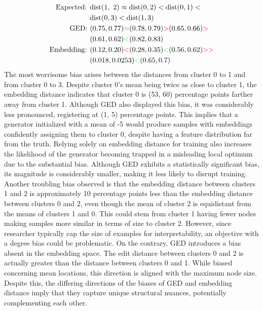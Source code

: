 \documentclass[
  11pt,
  letterpaper,
]{article}
\begin{document}
\begin{align*}
    \text{Expected: } &\text{dist}(1,\ 2) \approx \text{dist}(0, 2) < \text{dist}(0, 1) < \\ 
    &\text{dist}(0, 3) < \text{dist}(1, 3) \\ 
    \text{GED: }&(0.75, 0.77) \textcolor{green}{\approx} (0.78, 0.79) 
                \textcolor{red}{>} (0.65, 0.66) \textcolor{red}{>} \\
                &(0.61, 0.62) \textcolor{green}{<} (0.82, 0.83) \\
    \text{Embedding: }&(0.12, 0.20) \textcolor{red}{<} (0.28, 0.35) 
                \textcolor{green}{<} (0.56, 0.62) \textcolor{red}{>>} \\
                &(0.018, 0.0253) \textcolor{green}{<} (0.65, 0.7)
\end{align*} The most worrisome bias arises between the distances from
cluster 0 to 1 and from cluster 0 to 3. Despite cluster 0's mean being
twice as close to cluster 1, the embedding distance indicates that
cluster 0 is (53, 60) percentage points farther away from cluster 1.
Although GED also displayed this bias, it was considerably less
pronounced, registering at (1, 5) percentage points. This implies that a
generator initialized with a mean of -5 would produce samples with
embeddings confidently assigning them to cluster 0, despite having a
feature distribution far from the truth. Relying solely on embedding
distance for training also increases the likelihood of the generator
becoming trapped in a misleading local optimum due to the substantial
bias. Although GED exhibits a statistically significant bias, its
magnitude is considerably smaller, making it less likely to disrupt
training. Another troubling bias observed is that the embedding distance
between clusters 1 and 2 is approximately 10 percentage points less than
the embedding distance between clusters 0 and 2, even though the mean of
cluster 2 is equidistant from the means of clusters 1 and 0. This could
stem from cluster 1 having fewer nodes making samples more similar in
terms of size to cluster 2. However, since researcher typically cap the
size of examples for interpretability, an objective with a degree bias
could be problematic. On the contrary, GED introduces a bias absent in
the embedding space. The edit distance between clusters 0 and 2 is
actually greater than the distance between clusters 0 and 1. While
biased concerning mean locations, this direction is aligned with the
maximum node size. Despite this, the differing directions of the biases
of GED and embedding distance imply that they capture unique structural
nuances, potentially complementing each other.
\end{document}
